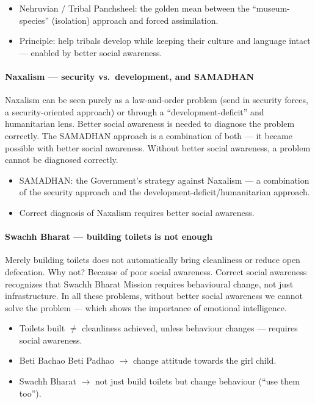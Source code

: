 \begin{GovtPolicy}
\begin{itemize}
\item Nehruvian / Tribal Panchsheel: the golden mean between the ``museum-species'' (isolation) approach and forced assimilation.
\item Principle: help tribals develop while keeping their culture and language intact --- enabled by better social awareness.
\end{itemize}
\end{GovtPolicy}

\paragraph{Naxalism --- security vs.\ development, and SAMADHAN} Naxalism can be seen purely as a law-and-order problem (send in security forces, a security-oriented approach) or through a ``development-deficit'' and humanitarian lens. Better social awareness is needed to diagnose the problem correctly. The SAMADHAN approach is a combination of both --- it became possible with better social awareness. Without better social awareness, a problem cannot be diagnosed correctly.

\begin{GovtPolicy}
\begin{itemize}
\item SAMADHAN: the Government's strategy against Naxalism --- a combination of the security approach and the development-deficit/humanitarian approach.
\item Correct diagnosis of Naxalism requires better social awareness.
\end{itemize}
\end{GovtPolicy}

\paragraph{Swachh Bharat --- building toilets is not enough} Merely building toilets does not automatically bring cleanliness or reduce open defecation. Why not? Because of poor social awareness. Correct social awareness recognizes that Swachh Bharat Mission requires behavioural change, not just infrastructure. In all these problems, without better social awareness we cannot solve the problem --- which shows the importance of emotional intelligence.

\begin{ExampleBox}
\begin{itemize}
\item Toilets built $\neq$ cleanliness achieved, unless behaviour changes --- requires social awareness.
\item Beti Bachao Beti Padhao $\rightarrow$ change attitude towards the girl child.
\item Swachh Bharat $\rightarrow$ not just build toilets but change behaviour (``use them too'').
\end{itemize}
\end{ExampleBox}

